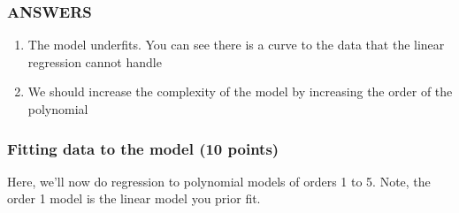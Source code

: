 \documentclass[11pt]{article}
\begin{document}
    \subsubsection{ANSWERS}\label{answers}

\begin{enumerate}
\def\labelenumi{(\arabic{enumi})}
\item
  The model underfits. You can see there is a curve to the data that the
  linear regression cannot handle
\item
  We should increase the complexity of the model by increasing the order
  of the polynomial
\end{enumerate}

    \subsubsection{Fitting data to the model (10
points)}\label{fitting-data-to-the-model-10-points}

Here, we'll now do regression to polynomial models of orders 1 to 5.
Note, the order 1 model is the linear model you prior fit.
\end{document}
